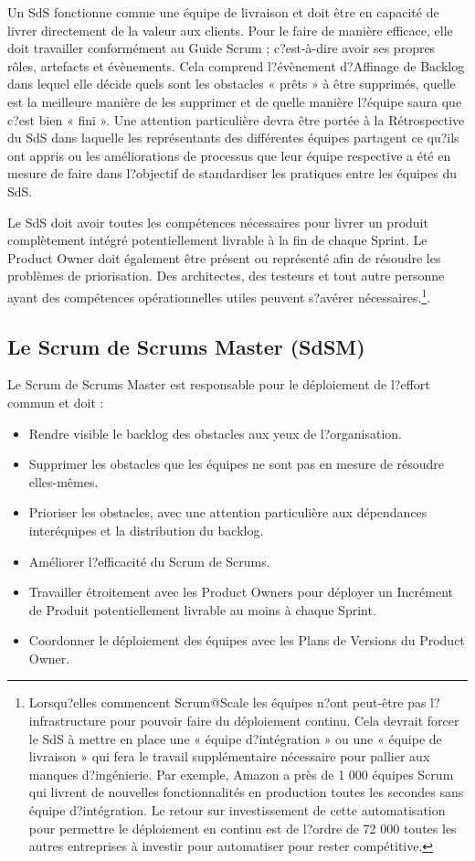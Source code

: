 \documentclass[12pt,a4paper,parskip=full]{scrartcl}
\begin{document}
Un SdS fonctionne comme une équipe de livraison et doit être en capacité de livrer
directement de la valeur aux clients. Pour le faire de manière efficace, elle doit travailler
conformément au Guide Scrum ; c?est-à-dire avoir ses propres rôles, artefacts et
évènements. Cela comprend l?évènement d?Affinage de Backlog dans lequel elle décide
quels sont les obstacles « prêts » à être supprimés, quelle est la meilleure manière de les
supprimer et de quelle manière l?équipe saura que c?est bien « fini ». Une attention
particulière devra être portée à la Rétrospective du SdS dans laquelle les représentants
des différentes équipes partagent ce qu?ils ont appris ou les améliorations de processus
que leur équipe respective a été en mesure de faire dans l?objectif de standardiser les
pratiques entre les équipes du SdS.

Le SdS doit avoir toutes les compétences nécessaires pour livrer un produit complètement
intégré potentiellement livrable à la fin de chaque Sprint. Le Product Owner doit également
être présent ou représenté afin de résoudre les problèmes de priorisation. Des architectes,
des testeurs et tout autre personne ayant des compétences opérationnelles utiles peuvent
s?avérer nécessaires.\footnote{Lorsqu?elles commencent Scrum@Scale les équipes n?ont peut-être pas
l?infrastructure pour pouvoir faire du déploiement continu. Cela devrait forcer le SdS à
mettre en place une « équipe d?intégration » ou une « équipe de livraison » qui fera le
travail supplémentaire nécessaire pour pallier aux manques d?ingénierie. Par exemple,
Amazon a près de 1 000 équipes Scrum qui livrent de nouvelles fonctionnalités en
production toutes les secondes sans équipe d?intégration. Le retour sur investissement
de cette automatisation pour permettre le déploiement en continu est de l?ordre de 72
000 %
toutes les autres entreprises à investir pour automatiser pour rester compétitive.}.

\subsection{Le Scrum de Scrums Master (SdSM)}
Le Scrum de Scrums Master est responsable pour le déploiement de l?effort commun et
doit :
\begin{itemize}
\item Rendre visible le backlog des obstacles aux yeux de l?organisation.
\item Supprimer les obstacles que les équipes ne sont pas en mesure de résoudre
elles-mêmes.
\item Prioriser les obstacles, avec une attention particulière aux dépendances interéquipes
et la distribution du backlog.
\item Améliorer l?efficacité du Scrum de Scrums.
\item Travailler étroitement avec les Product Owners pour déployer un Incrément de
Produit potentiellement livrable au moins à chaque Sprint.
\item Coordonner le déploiement des équipes avec les Plans de Versions du Product
Owner.
\end{itemize}
\end{document}
